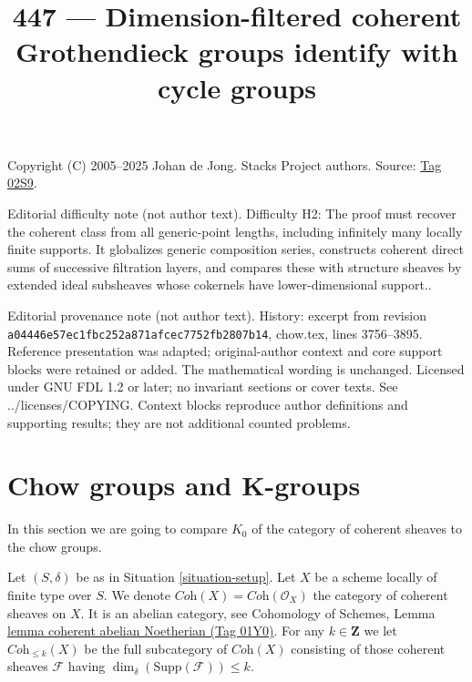 \documentclass{amsart}
\theoremstyle{plain}
\theoremstyle{definition}
\theoremstyle{remark}
\numberwithin{equation}{subsection}
\begin{document}
\title[Stacks Project, Tag 02S9]{447 --- Dimension-filtered coherent Grothendieck groups identify with cycle groups}
\maketitle
\noindent Copyright (C) 2005--2025 Johan de Jong. Stacks Project authors. Source: \href{https://stacks.math.columbia.edu/tag/02S9}{Tag 02S9}.

\noindent Editorial difficulty note (not author text). Difficulty H2: The proof must recover the coherent class from all generic-point lengths, including infinitely many locally finite supports. It globalizes generic composition series, constructs coherent direct sums of successive filtration layers, and compares these with structure sheaves by extended ideal subsheaves whose cokernels have lower-dimensional support..

\noindent Editorial provenance note (not author text). History: excerpt from revision \texttt{a0444\allowbreak 6e57e\allowbreak c1fbc\allowbreak 252a8\allowbreak 71afc\allowbreak ec775\allowbreak 2fb28\allowbreak 07b14}, chow.tex, lines 3756--3895. Reference presentation was adapted; original-author context and core support blocks were retained or added. The mathematical wording is unchanged. Licensed under GNU FDL 1.2 or later; no invariant sections or cover texts. See ../licenses/COPYING. Context blocks reproduce author definitions and supporting results; they are not additional counted problems.

\section{Chow groups and K-groups}
\label{section-chow-and-K}

\noindent
In this section we are going to compare $K_0$ of the
category of coherent sheaves to the chow groups.

\medskip\noindent
Let $(S, \delta)$ be as in Situation \ref{situation-setup}.
Let $X$ be a scheme locally of finite type over $S$.
We denote $\textit{Coh}(X) = \textit{Coh}(\mathcal{O}_X)$
the category of coherent sheaves on $X$.
It is an abelian category, see
Cohomology of Schemes, Lemma \href{https://stacks.math.columbia.edu/tag/01Y0}{lemma coherent abelian Noetherian (Tag 01Y0)}.
For any $k \in \mathbf{Z}$ we let $\textit{Coh}_{\leq k}(X)$
be the full subcategory of $\textit{Coh}(X)$
consisting of those coherent sheaves $\mathcal{F}$
having $\dim_\delta(\text{Supp}(\mathcal{F})) \leq k$.
\end{document}
